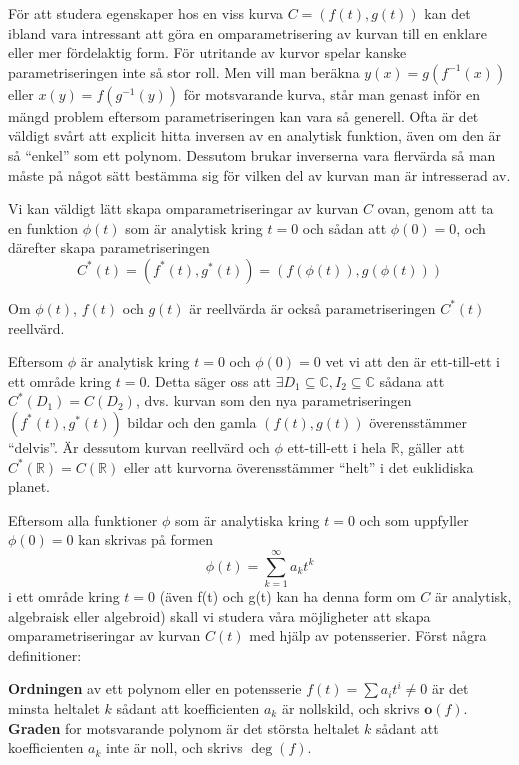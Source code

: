 För att studera egenskaper hos en viss kurva $C = (f(t), g(t))$ kan det ibland vara intressant att göra en omparametrisering av kurvan till en enklare eller mer fördelaktig form. För utritande av kurvor spelar kanske parametriseringen inte så stor roll. Men vill man beräkna $y(x) = g(f^{-1}(x))$ eller $x(y) = f(g^{-1}(y))$ för motsvarande kurva, står man genast inför en mängd problem eftersom parametriseringen kan vara så generell. Ofta är det väldigt svårt att explicit hitta inversen av en analytisk funktion, även om den är så ``enkel'' som ett polynom. Dessutom brukar inverserna vara flervärda så man måste på något sätt bestämma sig för vilken del av kurvan man är intresserad av.

Vi kan väldigt lätt skapa omparametriseringar av kurvan $C$ ovan, genom
att ta en funktion $\phi(t)$ som är analytisk kring $t = 0$ och sådan att $\phi(0) = 0$, och därefter skapa parametriseringen \[C^*(t) = (f^*(t), g^*(t)) = (f(\phi(t)), g(\phi(t)))\]

Om $\phi(t)$, $f(t)$ och $g(t)$ är reellvärda är också parametriseringen $C^*(t)$ reellvärd.

Eftersom $\phi$ är analytisk kring $t = 0$ och $\phi(0) = 0$ vet vi att den är ett-till-ett i ett område kring $t = 0$. Detta säger oss att $\exists D_1 \subseteq \mathbb{C}, I_2 \subseteq \mathbb{C}$ sådana att $C^*(D_1) = C(D_2)$, dvs. kurvan som den nya parametriseringen $(f^*(t), g^*(t))$ bildar och den gamla $(f(t), g(t))$ överensstämmer ``delvis''. Är dessutom kurvan reellvärd och $\phi$ ett-till-ett i hela $\mathbb{R}$, gäller att $C^*(\mathbb{R}) = C(\mathbb{R})$ eller att kurvorna överensstämmer ``helt'' i det euklidiska planet.

Eftersom alla funktioner $\phi$ som är analytiska kring $t = 0$ och som uppfyller $\phi(0) = 0$ kan skrivas på formen \[\phi(t)=\sum_{k=1}^{\infty}a_k t^k\] i ett område kring $t = 0$ (även f(t) och g(t) kan ha denna form om $C$ är analytisk, algebraisk eller algebroid) skall vi studera våra möjligheter att skapa omparametriseringar av kurvan $C(t)$ med hjälp av potensserier. Först några definitioner:

\begin{Definition}
\textbf{Ordningen} av ett polynom eller en potensserie $f(t) =
\sum a_i t^i \neq 0$ är det minsta heltalet $k$ sådant att koefficienten $a_k$ är nollskild, och skrivs $\mathbf{o}(f)$. \textbf{Graden} for motsvarande polynom är det största heltalet $k$ sådant att koefficienten $a_k$ inte är noll, och skrivs $\deg(f)$.
\end{Definition}

